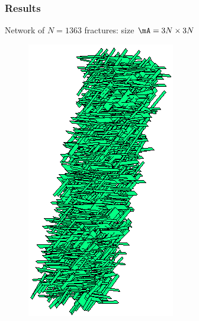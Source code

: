 
\begin{frame}
\frametitle{Results}

\small

Network of $N=1363$ fractures: size $\mA=3N\times 3N$
\vspace{-5pt}
\begin{figure}
\centering
\begin{minipage}[c]{.3\linewidth}
\includegraphics[width=\textwidth]{../images/visu_maillage1363Fracs.png}

\end{minipage}
\end{figure}
\end{frame}
